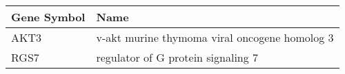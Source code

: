 \begin{tabular}{ll}
\toprule
Gene Symbol &                                          Name \\
\midrule
       AKT3 & v-akt murine thymoma viral oncogene homolog 3 \\
       RGS7 &            regulator of G protein signaling 7 \\
\bottomrule
\end{tabular}

